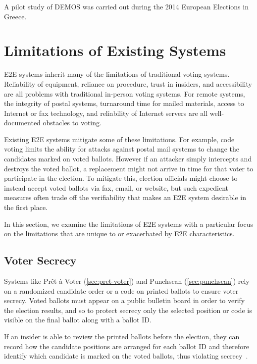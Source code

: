 A pilot study of DEMOS was carried out during the 2014 European
Elections in Greece.

\section{Limitations of Existing Systems}
\label{sec:limit-exist-syst}

E2E systems inherit many of the limitations of traditional voting
systems. Reliability of equipment, reliance on procedure, trust in
insiders, and accessibility are all problems with traditional
in-person voting systems. For remote systems, the integrity of postal
systems, turnaround time for mailed materials, access to Internet or
fax technology, and reliability of Internet servers are all
well-documented obstacles to voting. 

Existing E2E systems mitigate some of these limitations. For example,
code voting limits the ability for attacks against postal mail systems
to change the candidates marked on voted ballots. However if an
attacker simply intercepts and destroys the voted ballot, a
replacement might not arrive in time for that voter to participate in
the election. To mitigate this, election officials might choose to
instead accept voted ballots via fax, email, or website, but such
expedient measures often trade off the verifiability that makes an E2E
system desirable in the first place.

In this section, we examine the limitations of E2E systems with a
particular focus on the limitations that are unique to or exacerbated
by E2E characteristics.

\subsection{Voter Secrecy}

Systems like Prêt à Voter (\autoref{sec:pret-voter}) and Punchscan
(\autoref{sec:punchscan}) rely on a randomized candidate order or a code
on printed ballots to ensure voter secrecy. Voted ballots must appear
on a public bulletin board in order to verify the election results,
and so to protect secrecy only the selected position or code is
visible on the final ballot along with a ballot ID.

If an insider is able to review the printed ballots before the
election, they can record how the candidate positions are arranged for
each ballot ID and therefore identify which candidate is marked on the
voted ballots, thus violating secrecy~\cite{burton2012}.

